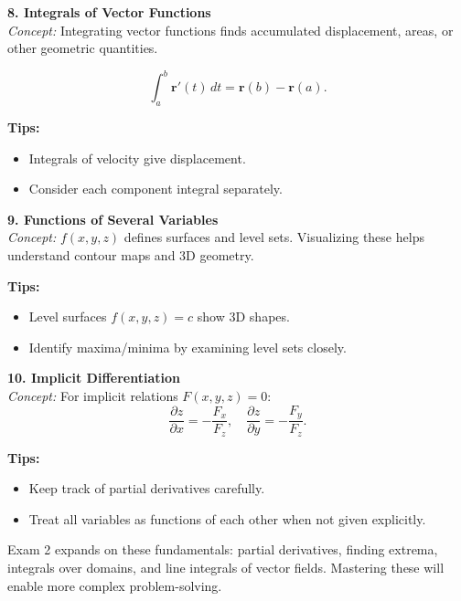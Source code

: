 \documentclass[9pt]{article}
\begin{document}
\begin{multicols}{2}
\begin{tcolorbox}[title=, colframe=brightyellow]
\textbf{8. Integrals of Vector Functions}\\
\textit{Concept:} Integrating vector functions finds accumulated displacement, areas, or other geometric quantities.

\[
\int_a^b \mathbf{r}'(t)\,dt=\mathbf{r}(b)-\mathbf{r}(a).
\]

\textbf{Tips:}
\begin{itemize}
    \item Integrals of velocity give displacement.
    \item Consider each component integral separately.
\end{itemize}
\end{tcolorbox}

\begin{tcolorbox}[title=, colframe=brightblue]
\textbf{9. Functions of Several Variables}\\
\textit{Concept:} $f(x,y,z)$ defines surfaces and level sets. Visualizing these helps understand contour maps and 3D geometry.

\textbf{Tips:}
\begin{itemize}
    \item Level surfaces $f(x,y,z)=c$ show 3D shapes.
    \item Identify maxima/minima by examining level sets closely.
\end{itemize}
\end{tcolorbox}

\begin{tcolorbox}[title=, colframe=brightgreen]
\textbf{10. Implicit Differentiation}\\
\textit{Concept:} For implicit relations $F(x,y,z)=0$:
\[
\frac{\partial z}{\partial x} = -\frac{F_x}{F_z}, \quad \frac{\partial z}{\partial y} = -\frac{F_y}{F_z}.
\]

\textbf{Tips:}
\begin{itemize}
    \item Keep track of partial derivatives carefully.
    \item Treat all variables as functions of each other when not given explicitly.
\end{itemize}
\end{tcolorbox}

\end{multicols}

\noindent Exam 2 expands on these fundamentals: partial derivatives, finding extrema, integrals over domains, and line integrals of vector fields. Mastering these will enable more complex problem-solving.
\end{document}
